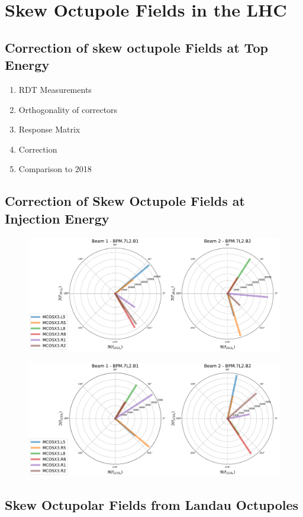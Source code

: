 \chapter{Skew Octupole Fields in the LHC}
\label{chapter:skew_octupole_fields}
\thumbforchapter{}
\chaptertoc{}
\newpage

\section{Correction of skew octupole Fields at Top Energy}

\begin{enumerate}
    \color{red}
    \item RDT Measurements
    \item Orthogonality of correctors
    \item Response Matrix
    \item Correction
    \item Comparison to 2018
\end{enumerate}


\section{Correction of Skew Octupole Fields at Injection Energy}

\begin{figure}[H]
    \includegraphics[width=\textwidth]{./chapters/07_octupoles/images/f1012_y_injection.pdf}
    \caption{}
    \label{fig:a4_injection_orthogonal_f1012}
\end{figure}

\begin{figure}[H]
    \includegraphics[width=\textwidth]{chapters/07_octupoles/images/f1210_x_injection.pdf}
    \caption{}
    \label{fig:a4_injection_orthogonal_f1210}
\end{figure}





\section{Skew Octupolar Fields from Landau Octupoles}